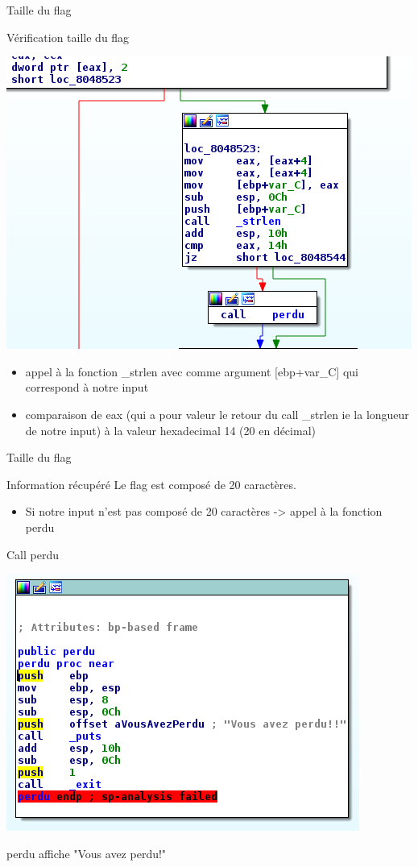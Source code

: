 \documentclass[10pt,sans,usenames,dvipsnames,french,compress]{beamer}
\begin{document}
\begin{frame}[fragile]{Taille du flag}
	\begin{block}{Vérification taille du flag}
		\begin{center}
			\includegraphics[width=0.5\linewidth]{114/lenght.png}
		\end{center}
	\end{block}

	\begin{exampleblock}{}
		\begin{itemize}
			\item appel à la fonction \_strlen avec comme argument [ebp+var\_C] qui correspond à notre input
			\item comparaison de eax (qui a pour valeur le retour du call \_strlen ie la longueur de notre input) à la valeur hexadecimal 14 (20 en décimal)
		\end{itemize}
	\end{exampleblock}
\end{frame}

\begin{frame}[fragile]{Taille du flag}
	\begin{block}{Information récupéré}
		Le flag est composé de 20 caractères.
	\end{block}

	\begin{exampleblock}{}
		\begin{itemize}
			\item Si notre input n'est pas composé de 20 caractères -> appel à la fonction perdu
		\end{itemize}
	\end{exampleblock}
\end{frame}

\begin{frame}[fragile]{Call perdu}
 	\begin{center}
		\includegraphics[width=0.5\linewidth]{114/perdu.png}
	\end{center}

	\begin{block}{}
		perdu affiche "Vous avez perdu!"
	\end{block}
\end{frame}
		
\end{document}
